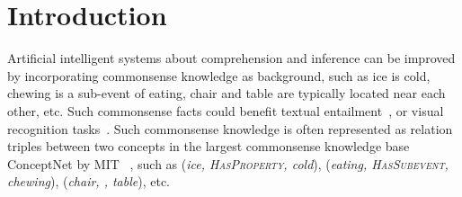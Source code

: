 \section{Introduction}
Artificial intelligent systems about comprehension and inference 
can be improved by incorporating commonsense knowledge as background, 
such as ice is cold, 
chewing is a sub-event of eating, 
chair and table are typically located near each other, etc. 
Such commonsense facts could benefit textual entailment~\cite{dagan2009recognizing,bowman2015large}, or visual recognition tasks~\cite{zhu2014reasoning}.
Such commonsense knowledge is often represented as relation triples
between two concepts in the largest commonsense knowledge base ConceptNet by MIT~\cite{speer2012representing}  , 
such as (\textit{ice, \textsc{HasProperty}, cold}), 
(\textit{eating, \textsc{HasSubevent}, chewing}), 
(\textit{chair, \lnear, table}), etc. 
